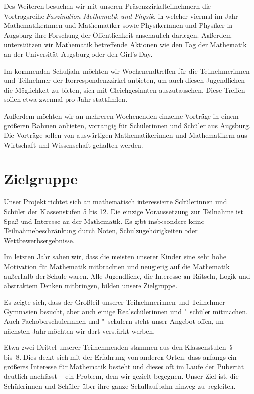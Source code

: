 \documentclass[12pt]{zettel}
\begin{document}
Des Weiteren besuchen wir mit unseren Präsenzzirkelteilnehmern die
Vortragsreihe \emph{Faszination Mathematik und Physik}, in welcher viermal im
Jahr Mathematikerinnen und Mathematiker sowie Physikerinnen und Physiker in Augsburg ihre Forschung der
Öffentlichkeit anschaulich darlegen. Außerdem unterstützen wir
Mathematik betreffende Aktionen wie den Tag der Mathematik an
der Universität Augsburg oder den Girl's Day.

Im kommenden Schuljahr möchten wir Wochenendtreffen für die Teilnehmerinnen und
Teilnehmer der Korrespondenzzirkel anbieten, um auch diesen Jugendlichen die
Möglichkeit zu bieten, sich mit Gleichgesinnten auszutauschen. Diese Treffen
sollen etwa zweimal pro Jahr stattfinden.

Außerdem möchten wir an mehreren Wochenenden einzelne Vorträge in einem
größeren Rahmen anbieten, vorrangig für Schülerinnen und Schüler aus Augsburg.
Die Vorträge sollen von auswärtigen Mathematikerinnen und Mathematikern aus
Wirtschaft und Wissenschaft gehalten werden.


\section{Zielgruppe}

Unser Projekt richtet sich an mathematisch interessierte Schülerinnen
und Schüler der Klassenstufen 5 bis 12. Die einzige Voraussetzung zur
Teilnahme ist Spaß und Interesse an der Mathematik. Es gibt insbesondere
keine Teilnahmebeschränkung durch Noten, Schulzugehörigkeiten oder
Wettbewerbsergebnisse.

Im letzten Jahr sahen wir, dass die meisten unserer Kinder eine
sehr hohe Motivation für Mathematik mitbrachten und neugierig auf die
Mathematik außerhalb der Schule waren. Alle Jugendliche, die Interesse an
Rätseln, Logik und abstraktem Denken mitbringen, bilden unsere
Zielgruppe.

Es zeigte sich, dass der Großteil unserer Teilnehmerinnen und
Teilnehmer Gymnasien besucht, aber auch einige Realschülerinnen und "~schüler mitmachen.
Auch Fachoberschülerinnen und "~schülern steht unser Angebot offen, im nächsten
Jahr möchten wir dort verstärkt werben.

Etwa zwei Drittel unserer Teilnehmenden
stammen aus den Klassenstufen~5 bis~8.
Dies deckt sich mit der
Erfahrung von anderen Orten, dass anfangs ein größeres Interesse für
Mathematik besteht und dieses oft im Laufe der Pubertät
deutlich nachlässt -- ein Problem, dem wir gezielt begegnen. Unser Ziel ist, die Schülerinnen und Schüler über ihre ganze Schullaufbahn hinweg zu begleiten.
\end{document}
